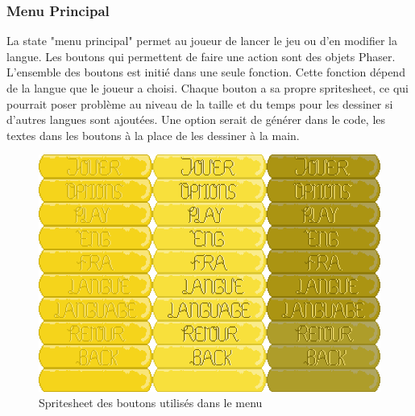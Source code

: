 \documentclass[11pt]{article}
\begin{document}
\subsubsection{Menu Principal}
La state "menu principal" permet au joueur de lancer le jeu ou d'en modifier la langue. Les boutons qui permettent de faire une action sont des objets Phaser. L'ensemble des boutons est initié dans une seule fonction. Cette fonction dépend de la langue que le joueur a choisi. Chaque bouton a sa propre spritesheet, ce qui pourrait poser problème au niveau de la taille et du temps pour les dessiner si d'autres langues sont ajoutées. Une option serait de générer dans le code, les textes dans les boutons à la place de les dessiner à la main.
\begin{figure}[h]
\includegraphics[scale=0.3]{boutons}
\centering
\caption{Spritesheet des boutons utilisés dans le menu}
\end{figure}
\end{document}
